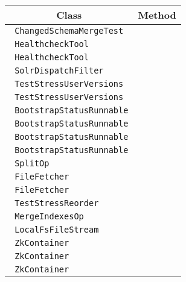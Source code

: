 \begin{center}
\begin{tabular}{ll}\toprule
\multicolumn{1}{c}{Class}&\multicolumn{1}{c}{Method}\\\midrule
\lstinline/ ChangedSchemaMergeTest/&\raisebox{0pt}{\lstinline/   optimizeDiffSchemas()/}\\ 
\lstinline/ HealthcheckTool/&\raisebox{0pt}{\lstinline/   runCloudTool(CloudSolrClient)/}\\ 
\lstinline/ HealthcheckTool/&\raisebox{0pt}{\lstinline/   runCloudTool(CloudSolrClient)/}\\ 
\lstinline/ SolrDispatchFilter/&\raisebox{0pt}{\lstinline/   authenticateRequest())/}\\ 
\lstinline/ TestStressUserVersions/&\raisebox{0pt}{\lstinline/   run()/}\\ 
\lstinline/ TestStressUserVersions/&\raisebox{0pt}{\lstinline/   run()/}\\ 
\lstinline/ BootstrapStatusRunnable/&\raisebox{0pt}{\lstinline/  sendBootstrapCommand()/}\\ 
\lstinline/ BootstrapStatusRunnable/&\raisebox{0pt}{\lstinline/   sendBootstrapCommand()/}\\ 
\lstinline/ BootstrapStatusRunnable/&\raisebox{0pt}{\lstinline/   sendBootstrapCommand()/}\\ 
\lstinline/ BootstrapStatusRunnable/&\raisebox{0pt}{\lstinline/   sendBootstrapCommand()/}\\ 
\lstinline/ SplitOp/&\raisebox{0pt}{\lstinline/   execute(CoreAdminHandler.CallInfoit)/}\\ 
\lstinline/ FileFetcher/&\raisebox{0pt}{\lstinline/   cleanup()/}\\ 
\lstinline/ FileFetcher/&\raisebox{0pt}{\lstinline/   cleanup()/}\\ 
\lstinline/ TestStressReorder/&\raisebox{0pt}{\lstinline/   run()/}\\ 
\lstinline/ MergeIndexesOp/&\raisebox{0pt}{\lstinline/   execute(CoreAdminHandler.CallInfoit)/}\\ 
\lstinline/ LocalFsFileStream/&\raisebox{0pt}{\lstinline/   write(out)/}\\ 
\lstinline/ ZkContainer/&\raisebox{0pt}{\lstinline/   publishCoresAsDown(List<SolrCore>)/}\\ 
\lstinline/ ZkContainer/&\raisebox{0pt}{\lstinline/   publishCoresAsDown(List<SolrCore>)/}\\ 
\lstinline/ ZkContainer/&\raisebox{0pt}{\lstinline/   publishCoresAsDown(List<SolrCore>)/}\\ 

\end{tabular}
\end{center}
